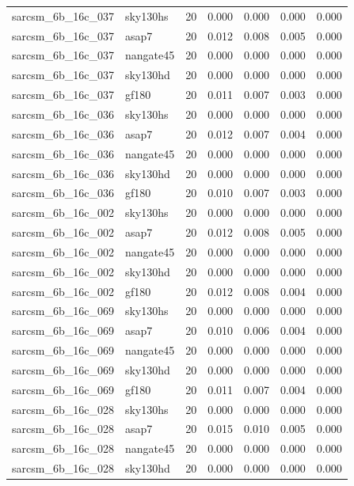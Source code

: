 \begin{tabular}{llrrrrr}
sarcsm\_6b\_16c\_037 & sky130hs & 20 & 0.000 & 0.000 & 0.000 & 0.000 \\
sarcsm\_6b\_16c\_037 & asap7 & 20 & 0.012 & 0.008 & 0.005 & 0.000 \\
sarcsm\_6b\_16c\_037 & nangate45 & 20 & 0.000 & 0.000 & 0.000 & 0.000 \\
sarcsm\_6b\_16c\_037 & sky130hd & 20 & 0.000 & 0.000 & 0.000 & 0.000 \\
sarcsm\_6b\_16c\_037 & gf180 & 20 & 0.011 & 0.007 & 0.003 & 0.000 \\
sarcsm\_6b\_16c\_036 & sky130hs & 20 & 0.000 & 0.000 & 0.000 & 0.000 \\
sarcsm\_6b\_16c\_036 & asap7 & 20 & 0.012 & 0.007 & 0.004 & 0.000 \\
sarcsm\_6b\_16c\_036 & nangate45 & 20 & 0.000 & 0.000 & 0.000 & 0.000 \\
sarcsm\_6b\_16c\_036 & sky130hd & 20 & 0.000 & 0.000 & 0.000 & 0.000 \\
sarcsm\_6b\_16c\_036 & gf180 & 20 & 0.010 & 0.007 & 0.003 & 0.000 \\
sarcsm\_6b\_16c\_002 & sky130hs & 20 & 0.000 & 0.000 & 0.000 & 0.000 \\
sarcsm\_6b\_16c\_002 & asap7 & 20 & 0.012 & 0.008 & 0.005 & 0.000 \\
sarcsm\_6b\_16c\_002 & nangate45 & 20 & 0.000 & 0.000 & 0.000 & 0.000 \\
sarcsm\_6b\_16c\_002 & sky130hd & 20 & 0.000 & 0.000 & 0.000 & 0.000 \\
sarcsm\_6b\_16c\_002 & gf180 & 20 & 0.012 & 0.008 & 0.004 & 0.000 \\
sarcsm\_6b\_16c\_069 & sky130hs & 20 & 0.000 & 0.000 & 0.000 & 0.000 \\
sarcsm\_6b\_16c\_069 & asap7 & 20 & 0.010 & 0.006 & 0.004 & 0.000 \\
sarcsm\_6b\_16c\_069 & nangate45 & 20 & 0.000 & 0.000 & 0.000 & 0.000 \\
sarcsm\_6b\_16c\_069 & sky130hd & 20 & 0.000 & 0.000 & 0.000 & 0.000 \\
sarcsm\_6b\_16c\_069 & gf180 & 20 & 0.011 & 0.007 & 0.004 & 0.000 \\
sarcsm\_6b\_16c\_028 & sky130hs & 20 & 0.000 & 0.000 & 0.000 & 0.000 \\
sarcsm\_6b\_16c\_028 & asap7 & 20 & 0.015 & 0.010 & 0.005 & 0.000 \\
sarcsm\_6b\_16c\_028 & nangate45 & 20 & 0.000 & 0.000 & 0.000 & 0.000 \\
sarcsm\_6b\_16c\_028 & sky130hd & 20 & 0.000 & 0.000 & 0.000 & 0.000 \\

\end{tabular}
